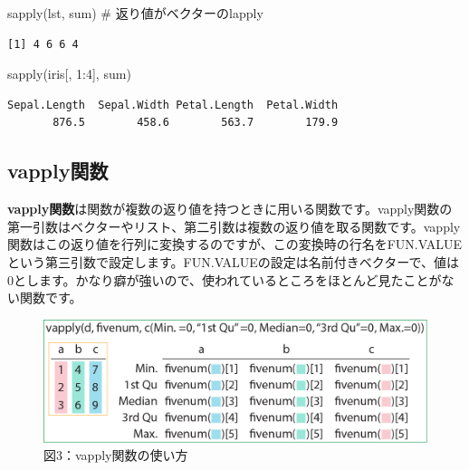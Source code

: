 \documentclass[
  letterpaper,
  DIV=11,
  numbers=noendperiod]{scrreprt}
\newenvironment{Shaded}{\begin{snugshade}}{\end{snugshade}}
\newcommand{\CommentTok}[1]{\textcolor[rgb]{0.37,0.37,0.37}{#1}}
\newcommand{\DecValTok}[1]{\textcolor[rgb]{0.68,0.00,0.00}{#1}}
\newcommand{\FunctionTok}[1]{\textcolor[rgb]{0.28,0.35,0.67}{#1}}
\newcommand{\NormalTok}[1]{\textcolor[rgb]{0.00,0.23,0.31}{#1}}
\newcommand{\SpecialCharTok}[1]{\textcolor[rgb]{0.37,0.37,0.37}{#1}}
\begin{document}
\begin{Shaded}
\begin{Highlighting}[]
\FunctionTok{sapply}\NormalTok{(lst, sum) }\CommentTok{\# 返り値がベクターのlapply}
\end{Highlighting}
\end{Shaded}

\begin{verbatim}
[1] 4 6 6 4
\end{verbatim}

\begin{Shaded}
\begin{Highlighting}[]
\FunctionTok{sapply}\NormalTok{(iris[, }\DecValTok{1}\SpecialCharTok{:}\DecValTok{4}\NormalTok{], sum)}
\end{Highlighting}
\end{Shaded}

\begin{verbatim}
Sepal.Length  Sepal.Width Petal.Length  Petal.Width 
       876.5        458.6        563.7        179.9 
\end{verbatim}

\hypertarget{vapplyux95a2ux6570}{%
\subsection{vapply関数}\label{vapplyux95a2ux6570}}

\textbf{vapply関数}は関数が複数の返り値を持つときに用いる関数です。vapply関数の第一引数はベクターやリスト、第二引数は複数の返り値を取る関数です。vapply関数はこの返り値を行列に変換するのですが、この変換時の行名をFUN.VALUEという第三引数で設定します。FUN.VALUEの設定は名前付きベクターで、値は0とします。かなり癖が強いので、使われているところをほとんど見たことがない関数です。

\begin{figure}

{\centering \includegraphics{././image/chapter15_vapply.png}

}

\caption{図3：vapply関数の使い方}

\end{figure}
\end{document}
